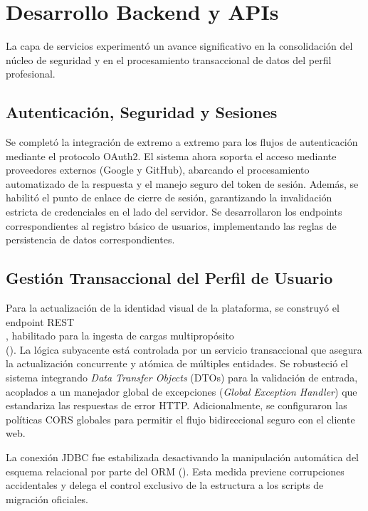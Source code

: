 \section{Desarrollo Backend y APIs}
\label{sec:backend}

La capa de servicios experimentó un avance significativo en la consolidación del núcleo de seguridad y en el procesamiento transaccional de datos del perfil profesional. 

\subsection{Autenticación, Seguridad y Sesiones}
Se completó la integración de extremo a extremo para los flujos de autenticación mediante el protocolo OAuth2. El sistema ahora soporta el acceso mediante proveedores externos (Google y GitHub), abarcando el procesamiento automatizado de la respuesta y el manejo seguro del token de sesión. Además, se habilitó el punto de enlace de cierre de sesión, garantizando la invalidación estricta de credenciales en el lado del servidor. Se desarrollaron los endpoints correspondientes al registro básico de usuarios, implementando las reglas de persistencia de datos correspondientes.

\subsection{Gestión Transaccional del Perfil de Usuario}
Para la actualización de la identidad visual de la plataforma, se construyó el endpoint REST \\ , habilitado para la ingesta de cargas multipropósito \\(). La lógica subyacente está controlada por un servicio transaccional que asegura la actualización concurrente y atómica de múltiples entidades.
Se robusteció el sistema integrando \textit{Data Transfer Objects} (DTOs) para la validación de entrada, acoplados a un manejador global de excepciones (\textit{Global Exception Handler}) que estandariza las respuestas de error HTTP. Adicionalmente, se configuraron las políticas CORS globales para permitir el flujo bidireccional seguro con el cliente web.

\begin{NotaTecnica}
La conexión JDBC fue estabilizada desactivando la manipulación automática del esquema relacional por parte del ORM (). Esta medida previene corrupciones accidentales y delega el control exclusivo de la estructura a los scripts de migración oficiales.
\end{NotaTecnica}